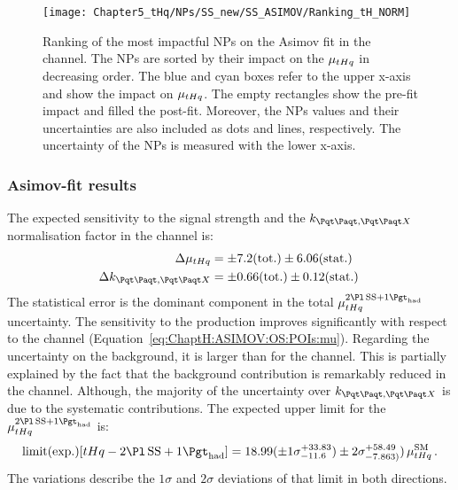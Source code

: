 \begin{figure}[h]%
    \centering
        \texttt{[image: Chapter5\_tHq/NPs/SS\_new/SS\_ASIMOV/Ranking\_tH\_NORM]}
    \caption{Ranking of the most impactful NPs on the Asimov fit in the \dilepSStau channel. 
    The NPs are sorted by their impact on the $\mu_{tHq}$ in decreasing order. 
    The blue and cyan boxes refer to the upper x-axis and show the impact on $\mu_{tHq}$.
    The empty rectangles show the pre-fit impact and filled the post-fit.
    Moreover, the NPs values and their uncertainties are also included as dots and 
    lines, respectively. The uncertainty of the NPs is measured with the lower x-axis.}
    \label{fig:ChaptH:Asimov:SS:Ranking}
\end{figure}



\FloatBarrier
\subsubsection{Asimov-fit results \dilepSStau}
\label{sec:ChaptH:Fit:ASIMOV:SS:results}
The expected sensitivity to the \tHq signal strength and the $k_{\ttbar, \ttX}$ normalisation
factor in the \dilepSStau channel is:
\begin{align}
	\Delta \mu_{\tHq} 	&= \pm 7.2 (\text{tot.}) \pm 6.06 (\text{stat.}) 	\label{eq:ChaptH:Fit:ASIMOV:SS:mu} \\
	\Delta k_{\ttbar, \ttX} 	&= \pm 0.66 (\text{tot.}) \pm 0.12 (\text{stat.}) 	\label{eq:ChaptH:Fit:ASIMOV:SS:k} \,
\end{align}
The statistical error is the dominant component in the total $\mu^{\dilepSStau}_{\tHq}$ uncertainty.
The sensitivity to the \tHq production improves significantly with respect to the \dilepOStau channel
(Equation~\ref{eq:ChaptH:ASIMOV:OS:POIs:mu}). Regarding the uncertainty on the background,
it is larger than for the \dilepOStau channel. This is partially explained by the fact that the background
contribution is remarkably reduced in the \dilepSStau channel. Although, the majority of the
uncertainty over $k_{\ttbar, \ttX}$ is due to the systematic contributions. %
The expected upper limit for the $\mu^{\dilepSStau}_{\tHq}$ is:
\begin{equation*}
	\text{limit(exp.)} [\tHq - \dilepSStau]= 18.99 (\pm 1\sigma^{+33.83}_{-11.6}) \pm 2\sigma^{+58.49}_{-7.863)}) \,\mu^{\text{SM}}_{\tHq}\, .
\end{equation*}
The variations describe the $1\sigma$ and $2\sigma$ deviations of that limit in both directions.

